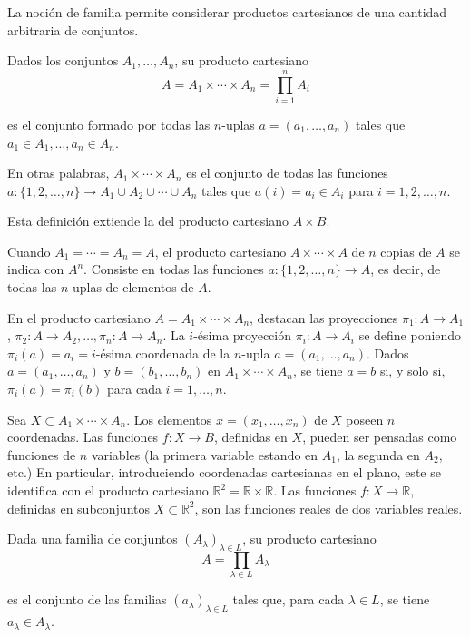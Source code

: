 \documentclass[12pt,oneside]{book}
\begin{document}
La noción de familia permite considerar productos cartesianos de una cantidad arbitraria de conjuntos.

Dados los conjuntos \( A_1, \ldots, A_n \), su producto cartesiano
\[
A = A_1 \times \cdots \times A_n = \prod_{i=1}^n A_i
\]

es el conjunto formado por todas las \( n \)-uplas \( a = (a_1, \ldots, a_n) \) tales que \( a_1 \in A_1, \ldots, a_n \in A_n \).

En otras palabras, \( A_1 \times \cdots \times A_n \) es el conjunto de todas las funciones \( a : \{1, 2, \ldots, n\} \to A_1 \cup A_2 \cup \cdots \cup A_n \) tales que \( a(i) = a_i \in A_i \) para \( i = 1, 2, \ldots, n \).

Esta definición extiende la del producto cartesiano \( A \times B \).

Cuando \( A_1 = \cdots = A_n = A \), el producto cartesiano \( A \times \cdots \times A \) de \( n \) copias de \( A \) se indica con \( A^n \). Consiste en todas las funciones \( a : \{1, 2, \ldots, n\} \to A \), es decir, de todas las \( n \)-uplas de elementos de \( A \).

En el producto cartesiano \( A = A_1 \times \cdots \times A_n \), destacan las proyecciones \( \pi_1 : A \to A_1 \), \( \pi_2 : A \to A_2, \ldots, \pi_n : A \to A_n \). La \( i \)-ésima proyección \( \pi_i : A \to A_i \) se define poniendo \( \pi_i(a) = a_i = i \)-ésima coordenada de la \( n \)-upla \( a = (a_1, \ldots, a_n) \). Dados \( a = (a_1, \ldots, a_n) \) y \( b = (b_1, \ldots, b_n) \) en \( A_1 \times \cdots \times A_n \), se tiene \( a = b \) si, y solo si, \( \pi_i(a) = \pi_i(b) \) para cada \( i = 1, \ldots, n \).

Sea \( X \subset A_1 \times \cdots \times A_n \). Los elementos \( x = (x_1, \ldots, x_n) \) de \( X \) poseen \( n \) coordenadas. Las funciones \( f : X \to B \), definidas en \( X \), pueden ser pensadas como funciones de \( n \) variables (la primera variable estando en \( A_1 \), la segunda en \( A_2 \), etc.) En particular, introduciendo coordenadas cartesianas en el plano, este se identifica con el producto cartesiano \( \mathbb{R}^2 = \mathbb{R} \times \mathbb{R} \). Las funciones \( f : X \to \mathbb{R} \), definidas en subconjuntos \( X \subset \mathbb{R}^2 \), son las funciones reales de dos variables reales.

Dada una familia de conjuntos \( (A_\lambda)_{\lambda \in L} \), su producto cartesiano
\[
A = \prod_{\lambda \in L} A_\lambda
\]

es el conjunto de las familias \((a_\lambda)_{\lambda \in L}\) tales que, para cada \(\lambda \in L\), se tiene \(a_\lambda \in A_\lambda\).
\end{document}
